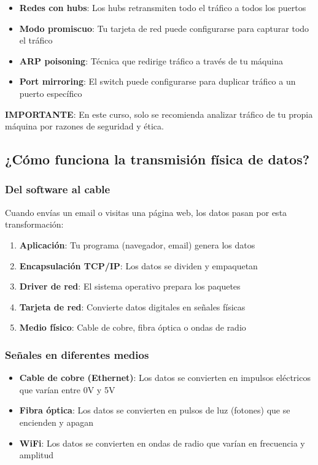 \begin{itemize}
\begin{itemize}
    \item \textbf{Redes con hubs}: Los hubs retransmiten todo el tráfico a todos los puertos
    \item \textbf{Modo promiscuo}: Tu tarjeta de red puede configurarse para capturar todo el tráfico
    \item \textbf{ARP poisoning}: Técnica que redirige tráfico a través de tu máquina
    \item \textbf{Port mirroring}: El switch puede configurarse para duplicar tráfico a un puerto específico
\end{itemize}

\textbf{IMPORTANTE}: En este curso, solo se recomienda analizar tráfico de tu propia máquina por razones de seguridad y ética.

\subsection{¿Cómo funciona la transmisión física de datos?}

\subsubsection{Del software al cable}

Cuando envías un email o visitas una página web, los datos pasan por esta transformación:

\begin{enumerate}
    \item \textbf{Aplicación}: Tu programa (navegador, email) genera los datos
    \item \textbf{Encapsulación TCP/IP}: Los datos se dividen y empaquetan
    \item \textbf{Driver de red}: El sistema operativo prepara los paquetes
    \item \textbf{Tarjeta de red}: Convierte datos digitales en señales físicas
    \item \textbf{Medio físico}: Cable de cobre, fibra óptica o ondas de radio
\end{enumerate}

\subsubsection{Señales en diferentes medios}

\begin{itemize}
    \item \textbf{Cable de cobre (Ethernet)}: Los datos se convierten en impulsos eléctricos que varían entre 0V y 5V
    \item \textbf{Fibra óptica}: Los datos se convierten en pulsos de luz (fotones) que se encienden y apagan
    \item \textbf{WiFi}: Los datos se convierten en ondas de radio que varían en frecuencia y amplitud
\end{itemize}


\end{itemize}
